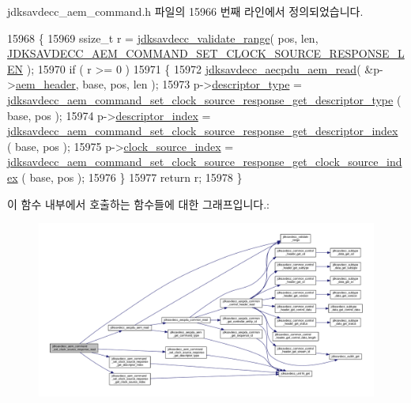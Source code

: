 jdksavdecc\+\_\+aem\+\_\+command.\+h 파일의 15966 번째 라인에서 정의되었습니다.


\begin{DoxyCode}
15968 \{
15969     ssize\_t r = \hyperlink{group__util_ga9c02bdfe76c69163647c3196db7a73a1}{jdksavdecc\_validate\_range}( pos, len, 
      \hyperlink{group__command__set__clock__source__response_ga2f7212bbaae35f932ace0d4f8425b767}{JDKSAVDECC\_AEM\_COMMAND\_SET\_CLOCK\_SOURCE\_RESPONSE\_LEN} );
15970     \textcolor{keywordflow}{if} ( r >= 0 )
15971     \{
15972         \hyperlink{group__aecpdu__aem_gae2421015dcdce745b4f03832e12b4fb6}{jdksavdecc\_aecpdu\_aem\_read}( &p->\hyperlink{structjdksavdecc__aem__command__set__clock__source__response_ae1e77ccb75ff5021ad923221eab38294}{aem\_header}, base, pos, len );
15973         p->\hyperlink{structjdksavdecc__aem__command__set__clock__source__response_ab7c32b6c7131c13d4ea3b7ee2f09b78d}{descriptor\_type} = 
      \hyperlink{group__command__set__clock__source__response_gaf651f455e5ae050ebb45c8b629216ad2}{jdksavdecc\_aem\_command\_set\_clock\_source\_response\_get\_descriptor\_type}
      ( base, pos );
15974         p->\hyperlink{structjdksavdecc__aem__command__set__clock__source__response_a042bbc76d835b82d27c1932431ee38d4}{descriptor\_index} = 
      \hyperlink{group__command__set__clock__source__response_gafece94c6286479a3c806d3997c73f3d5}{jdksavdecc\_aem\_command\_set\_clock\_source\_response\_get\_descriptor\_index}
      ( base, pos );
15975         p->\hyperlink{structjdksavdecc__aem__command__set__clock__source__response_ae6d3717453951addecc331540f572e30}{clock\_source\_index} = 
      \hyperlink{group__command__set__clock__source__response_gaff5350e050fff702114026f9230960ec}{jdksavdecc\_aem\_command\_set\_clock\_source\_response\_get\_clock\_source\_index}
      ( base, pos );
15976     \}
15977     \textcolor{keywordflow}{return} r;
15978 \}
\end{DoxyCode}


이 함수 내부에서 호출하는 함수들에 대한 그래프입니다.\+:
\nopagebreak
\begin{figure}[H]
\begin{center}
\leavevmode
\includegraphics[width=350pt]{group__command__set__clock__source__response_ga0513a89703f86698de78fd0254d6af48_cgraph}
\end{center}
\end{figure}




